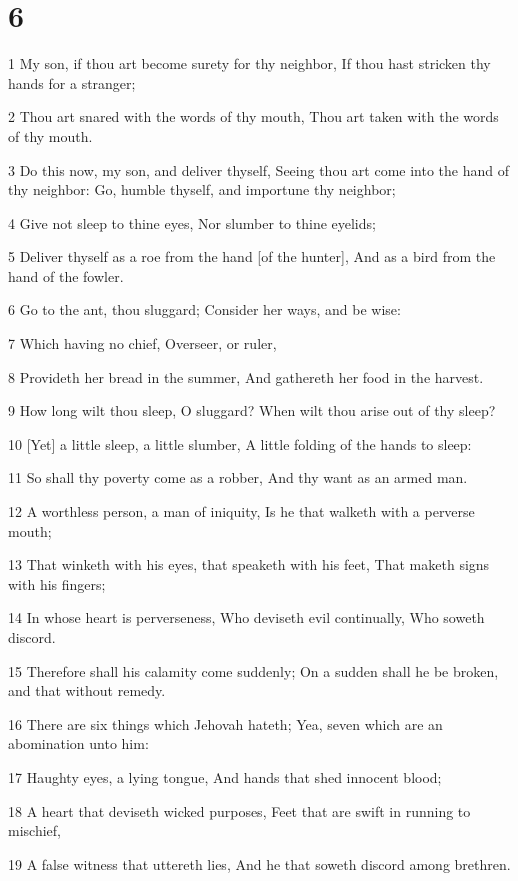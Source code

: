 \chapter{6}

\par 1 My son, if thou art become surety for thy neighbor, If thou hast stricken thy hands for a stranger;
\par 2 Thou art snared with the words of thy mouth, Thou art taken with the words of thy mouth.
\par 3 Do this now, my son, and deliver thyself, Seeing thou art come into the hand of thy neighbor: Go, humble thyself, and importune thy neighbor;
\par 4 Give not sleep to thine eyes, Nor slumber to thine eyelids;
\par 5 Deliver thyself as a roe from the hand [of the hunter], And as a bird from the hand of the fowler.
\par 6 Go to the ant, thou sluggard; Consider her ways, and be wise:
\par 7 Which having no chief, Overseer, or ruler,
\par 8 Provideth her bread in the summer, And gathereth her food in the harvest.
\par 9 How long wilt thou sleep, O sluggard? When wilt thou arise out of thy sleep?
\par 10 [Yet] a little sleep, a little slumber, A little folding of the hands to sleep:
\par 11 So shall thy poverty come as a robber, And thy want as an armed man.
\par 12 A worthless person, a man of iniquity, Is he that walketh with a perverse mouth;
\par 13 That winketh with his eyes, that speaketh with his feet, That maketh signs with his fingers;
\par 14 In whose heart is perverseness, Who deviseth evil continually, Who soweth discord.
\par 15 Therefore shall his calamity come suddenly; On a sudden shall he be broken, and that without remedy.
\par 16 There are six things which Jehovah hateth; Yea, seven which are an abomination unto him:
\par 17 Haughty eyes, a lying tongue, And hands that shed innocent blood;
\par 18 A heart that deviseth wicked purposes, Feet that are swift in running to mischief,
\par 19 A false witness that uttereth lies, And he that soweth discord among brethren.
